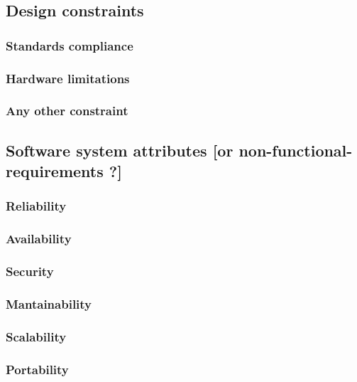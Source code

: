 \subsection{Design constraints}
\label{subsect:designconstraints}

\subsubsection{Standards compliance}
\label{subsubsect:standardscompliance}

\subsubsection{Hardware limitations}
\label{subsubsect:hardwarelimitations}

\subsubsection{Any other constraint}
\label{subsubsect:anyotherconstraint}

\subsection{Software system attributes [or non-functional-requirements ?]}
\label{subsect:softwaresystemattributes}

\subsubsection{Reliability}
\label{subsubsect:reliability}

\subsubsection{Availability}
\label{subsubsect:availability}

\subsubsection{Security}
\label{subsubsect:security}

\subsubsection{Mantainability}
\label{subsubsect:mantainability}

\subsubsection{Scalability}
\label{subsubsect:scalability}

\subsubsection{Portability}
\label{subsubsect:portability}
